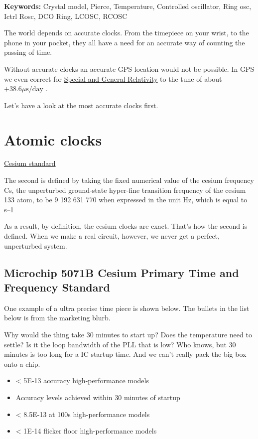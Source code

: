 \textbf{Keywords:} Crystal model, Pierce, Temperature, Controlled
oscillator, Ring osc, Ictrl Rosc, DCO Ring, LCOSC, RCOSC

The world depends on accurate clocks. From the timepiece on your wrist,
to the phone in your pocket, they all have a need for an accurate way of
counting the passing of time.

Without accurate clocks an accurate GPS location would not be possible.
In GPS we even correct for
\href{https://en.wikipedia.org/wiki/Error_analysis_for_the_Global_Positioning_System}{Special
and General Relativity} to the tune of about \(+38.6 \mu\text{s/day }\).

Let's have a look at the most accurate clocks first.

\section{Atomic clocks}\label{atomic-clocks}

\href{https://en.wikipedia.org/wiki/Caesium_standard}{Cesium standard}

The second is defined by taking the fixed numerical value of the cesium
frequency Cs, the unperturbed ground-state hyper-fine transition
frequency of the cesium 133 atom, to be 9 192 631 770 when expressed in
the unit Hz, which is equal to s--1

As a result, by definition, the cesium clocks are exact. That's how the
second is defined. When we make a real circuit, however, we never get a
perfect, unperturbed system.

\subsection{Microchip 5071B Cesium Primary Time and Frequency
Standard}\label{microchip-5071b-cesium-primary-time-and-frequency-standard}

One example of a ultra precise time piece is shown below. The bullets in
the list below is from the marketing blurb.

Why would the thing take 30 minutes to start up? Does the temperature
need to settle? Is it the loop bandwidth of the PLL that is low? Who
knows, but 30 minutes is too long for a IC startup time. And we can't
really pack the big box onto a chip.

\begin{itemize}
\tightlist
\item
  \textless{} 5E-13 accuracy high-performance models
\item
  Accuracy levels achieved within 30 minutes of startup
\item
  \textless{} 8.5E-13 at 100s high-performance models
\item
  \textless{} 1E-14 flicker floor high-performance models
\end{itemize}


